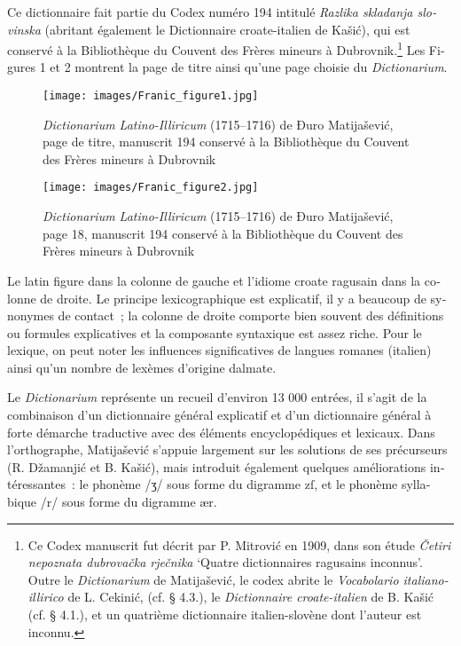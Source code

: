 \documentclass[output=paper,colorlinks,citecolor=brown,arabicfont,chinesefont,booklanguage=french]{langscibook}
\begin{document}
\begin{otherlanguage}{french}
Ce dictionnaire fait partie du Codex numéro 194 intitulé \emph{Razlika skladanja slovinska} (abritant également le Dictionnaire croate-italien de Kašić), qui est conservé à la Bibliothèque du Couvent des Frères mineurs à Dubrovnik.\footnote{Ce Codex manuscrit fut décrit par P. Mitrović en 1909, dans son étude \emph{Četiri nepoznata dubrovačka rječnika} ‘Quatre dictionnaires ragusains inconnus’. Outre le \emph{Dictionarium} de Matijašević, le codex abrite le \emph{Vocabolario italiano-illirico} de L. Cekinić, (cf. § 4.3.), le \emph{Dictionnaire croate-italien} de B. Kašić (cf. § 4.1.), et un quatrième dictionnaire italien-slovène dont l’auteur est inconnu.}  Les Figures 1 et 2 montrent la page de titre ainsi qu’une page choisie du \emph{Dictionarium}.

\begin{figure}
\texttt{[image: images/Franic\_figure1.jpg]}
\caption{\emph{Dictionarium Latino-Illiricum} (1715--1716) de Đuro Matijašević, page de titre, manuscrit 194 conservé à la Bibliothèque du Couvent des Frères mineurs à Dubrovnik}
\label{Figure 1}
\end{figure}

\begin{figure}
\texttt{[image: images/Franic\_figure2.jpg]}
\caption{\emph{Dictionarium Latino-Illiricum} (1715--1716) de Đuro Matijašević, page 18, manuscrit 194 conservé à la Bibliothèque du Couvent des Frères mineurs à Dubrovnik}
\label{Figure 2}
\end{figure}

Le latin figure dans la colonne de gauche et l’idiome croate ragusain dans la colonne de droite. Le principe lexicographique est explicatif, il y a beaucoup de synonymes de contact~; la colonne de droite comporte bien souvent des définitions ou formules explicatives et la composante syntaxique est assez riche. Pour le lexique, on peut noter les influences significatives de langues romanes (italien) ainsi qu’un nombre de lexèmes d’origine dalmate. 

Le \emph{Dictionarium} représente un recueil d’environ 13 000 entrées, il s’agit de la combinaison d’un dictionnaire général explicatif et d’un dictionnaire général à forte démarche traductive avec des éléments encyclopédiques et lexicaux. Dans l’orthographe, Matijašević s’appuie largement sur les solutions de ses précurseurs (R. Džamanjić et B. Kašić), mais introduit également quelques améliorations intéressantes~: le phonème /ӡ/ sous forme du digramme zſ, et le phonème syllabique /r/ sous forme du digramme ær.


\end{otherlanguage}
\end{document}
